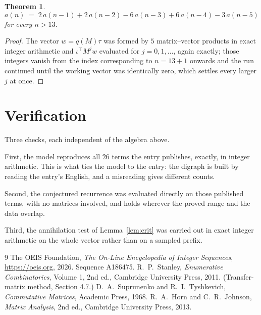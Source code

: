 \documentclass[11pt,a4paper]{article}
\theoremstyle{plain}
\newtheorem{theorem}{Theorem}
\theoremstyle{definition}
\begin{document}
\begin{theorem}
\[
a(n)\;=\;2\,a(n-1) + 2\,a(n-2) - 6\,a(n-3) + 6\,a(n-4) - 3\,a(n-5)
\]
for every $n>13$.
\end{theorem}

\begin{proof}
The vector $w=q(M)\tau$ was formed by $5$ matrix--vector products in exact integer
arithmetic and $\iota^{\!\top}M^{j}w$ evaluated for $j=0,1,\dots$, again exactly; those
integers vanish from the index corresponding to $n=13+1$ onwards and the run continued
until the working vector was identically zero, which settles every larger $j$ at once.
\end{proof}

\section{Verification}

Three checks, each independent of the algebra above.

First, the model reproduces all $26$ terms the entry publishes, exactly, in integer
arithmetic. This is what ties the model to the entry: the digraph is built by reading the
entry's English, and a misreading gives different counts.

Second, the conjectured recurrence was evaluated directly on those published terms, with no
matrices involved, and holds wherever the proved range and the data overlap.

Third, the annihilation test of Lemma~\ref{lem:crit} was carried out in exact integer
arithmetic on the whole vector rather than on a sampled prefix.

\begin{thebibliography}{9}
 The OEIS Foundation, \emph{The On-Line Encyclopedia of Integer
Sequences}, \url{https://oeis.org}, 2026. Sequence A186475.
 R.~P.~Stanley, \emph{Enumerative Combinatorics}, Volume 1, 2nd ed.,
Cambridge University Press, 2011. (Transfer-matrix method, Section 4.7.)
 D.~A.~Suprunenko and R.~I.~Tyshkevich, \emph{Commutative Matrices},
Academic Press, 1968.
 R.~A.~Horn and C.~R.~Johnson, \emph{Matrix Analysis}, 2nd ed., Cambridge
University Press, 2013.
\end{thebibliography}
\end{document}
